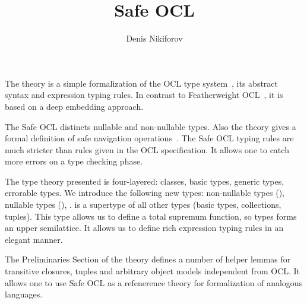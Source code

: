 \documentclass[11pt,a4paper]{book}
\makeatletter
\newenvironment{abstract}{%
  \small
  \begin{center}%
    {\bfseries \abstractname\vspace{-.5em}\vspace{\z@}}%
  \end{center}%
  \quotation}{\endquotation}
\makeatother
\begin{document}
\title{Safe OCL}
\author{Denis Nikiforov}
\maketitle

\begin{abstract}
  The theory is a simple formalization of the OCL type system~\cite{OCL24},
  its abstract syntax and expression typing rules.
  In contrast to Featherweight OCL~\cite{Featherweight_OCL-AFP},
  it is based on a deep embedding approach.

  The Safe OCL distincts nullable and non-nullable types. Also
  the theory gives a formal definition of safe navigation
  operations~\cite{DBLP:conf/models/Willink15}. The Safe OCL typing rules
  are much stricter than rules given in the OCL specification.
  It allows one to catch more errors on a type checking phase.

  The type theory presented is four-layered: classes, basic types,
  generic types, errorable types. We introduce the following new types:
  non-nullable types (),
  nullable types (\isa{{\isasymtau}{\isacharbrackleft}{\isacharquery}{\isacharbrackright}}),
  .  is a supertype of all other types
  (basic types, collections, tuples). This type allows us to define
  a total supremum function, so types forms an upper semilattice.
  It allows us to define rich expression typing rules in an elegant manner.

  The Preliminaries Section of the theory defines a number of
  helper lemmas for transitive closures, tuples and arbitrary
  object models independent from OCL. It allows one to use
  Safe OCL as a refenerence theory for formalization of
  analogous languages.
\end{abstract}

\tableofcontents





\end{document}
